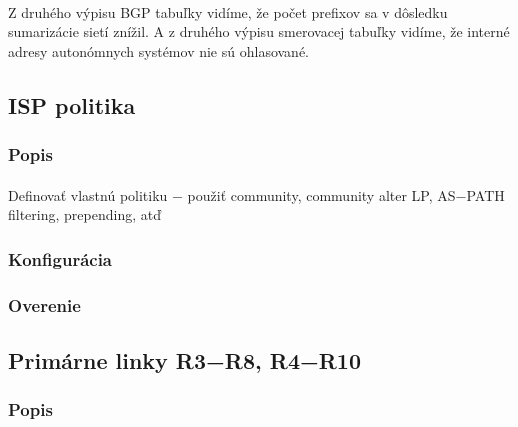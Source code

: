 \documentclass[12pt,twoside,a4paper]{report}
\begin{document}
\paragraph{}
Z druhého výpisu BGP tabuľky vidíme, že počet prefixov sa v dôsledku sumarizácie sietí znížil. A z druhého výpisu smerovacej tabuľky vidíme, že interné adresy autonómnych systémov nie sú ohlasované.












\subsection{ISP politika}
\subsubsection{Popis}
\paragraph{}
Definovať vlastnú politiku − použiť community, community alter LP, AS−PATH filtering, prepending, atď

\subsubsection{Konfigurácia}
\paragraph{}

\subsubsection{Overenie}
\paragraph{}

\subsection{Primárne linky R3−R8, R4−R10}
\subsubsection{Popis}
\paragraph{}
\end{document}
